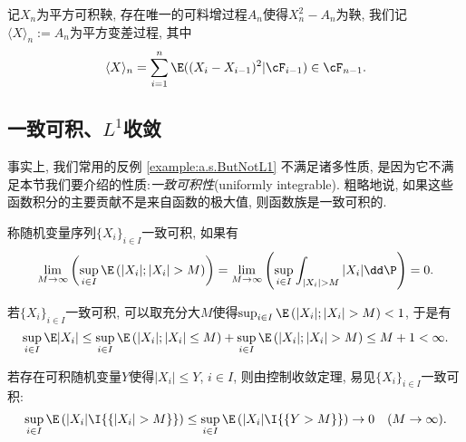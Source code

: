 \documentclass[a4paper, 10pt]{ctexart}
\begin{document}
\begin{definition}[平方变差过程]
	记$X_n$为平方可积鞅, 存在唯一的可料增过程$A_n$使得$X_n^2 - A_n$为鞅, 我们记$\langle X \rangle_n := A_n$为平方变差过程, 其中
	\begin{equation*}
		\langle X \rangle_n = \sum_{i = 1}^n \E((X_i - X_{i-1})^2 | \cF_{i-1}) \in \cF_{n-1}. 
	\end{equation*}
\end{definition}

\subsection{一致可积、$L^1$收敛}

事实上, 我们常用的反例 \ref{example:a.s.ButNotL1} 不满足诸多性质, 是因为它不满足本节我们要介绍的性质:\emph{一致可积性}(uniformly integrable). 
粗略地说, 如果这些函数积分的主要贡献不是来自函数的极大值, 则函数族是一致可积的. 
\begin{definition}[一致可积]
	称随机变量序列$\{X_i\}_{i \in I}$一致可积, 如果有
\begin{equation}
	\lim_{M \to \infty} \left( \sup_{i \in I} \E \left( |X_i|; |X_i| > M \right) \right) 
	= \lim_{M \to \infty} \left( \sup_{i \in I} \int_{|X_i| > M} |X_i| \dd \P \right)
	= 0. 
\end{equation}
\end{definition}


\begin{remark}\label{rm:UIimpliesBddE}
	若$\{X_i\}_{i \in I}$一致可积, 可以取充分大$M$使得$\sup_{i \in I} \E \left( |X_i|; |X_i| > M \right) < 1$, 于是有
	\begin{equation*}
		\sup_{i \in I} \E |X_i| 
		\leq \sup_{i \in I} \E \left( |X_i|; |X_i| \leq M \right) + \sup_{i \in I} \E \left( |X_i|; |X_i| > M \right)
		\leq M+1 < \infty. 
	\end{equation*}
\end{remark}

\begin{remark}
	若存在可积随机变量$Y$使得$|X_i| \leq Y$, $i \in I$, 则由控制收敛定理, 易见$\{X_i\}_{i \in I}$一致可积: 
	\begin{equation*}
		\sup_{i \in I} \E \left( |X_i| \I{\{|X_i| > M\}} \right)  
		\leq \sup_{i \in I} \E \left( |X_i| \I{\{Y > M\}} \right) 
		\to 0 \quad (M \to \infty). 
	\end{equation*}
\end{remark}
\end{document}
